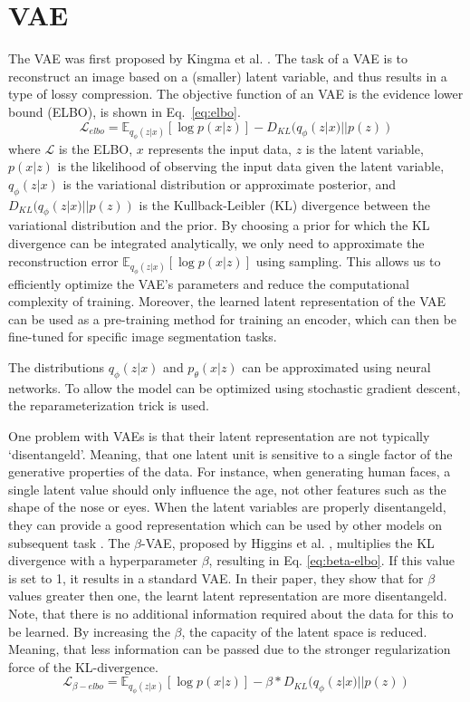 \section{VAE}
The VAE was first proposed by Kingma et al. \cite{kingma2014autoencodingvariationalbayes}. The task of a VAE is to reconstruct an image based on a (smaller) latent variable, and thus results in a type of lossy compression. The objective function of an VAE is the evidence lower bound (ELBO), is shown in Eq.~\ref{eq:elbo}.
\begin{equation}
    \label{eq:elbo}
    \mathcal{L}_{elbo} = \mathbb{E}_{q_{\phi}(z|x)}[\log p(x|z)] - D_{KL}(q_{\phi}(z|x) || p(z))
\end{equation}
where $\mathcal{L}$ is the ELBO, $x$ represents the input data, $z$ is the latent variable, $p(x|z)$ is the likelihood of observing the input data given the latent variable, $q_\phi(z|x)$ is the variational distribution or approximate posterior, and $D_{KL}(q_{\phi}(z|x) || p(z))$ is the Kullback-Leibler (KL) divergence between the variational distribution and the prior. By choosing a prior for which the KL divergence can be integrated analytically, we only need to approximate the reconstruction error $\mathbb{E}_{q_{\phi}(z|x)}[\log p(x|z)]$ using sampling. This allows us to efficiently optimize the VAE's parameters and reduce the computational complexity of training. Moreover, the learned latent representation of the VAE can be used as a pre-training method for training an encoder, which can then be fine-tuned for specific image segmentation tasks.

The distributions $q_{\phi}(z | x)$ and $p_{\theta}(x | z)$ can be approximated using neural networks. To allow the model can be optimized using stochastic gradient descent, the reparameterization trick is used.

One problem with VAEs is that their latent representation are not typically `disentangeld'. Meaning, that one latent unit is sensitive to a single factor of the generative properties of the data. For instance, when generating human faces, a single latent value should only influence the age, not other features such as the shape of the nose or eyes. When the latent variables are properly disentangeld, they can provide a good representation which can be used by other models on subsequent task \cite{bengio2014representationlearningreviewnew}. The $\beta$-VAE, proposed by Higgins et al. \cite{higgins2017betavae}, multiplies the KL divergence with a hyperparameter $\beta$, resulting in Eq. \ref{eq:beta-elbo}. If this value is set to 1, it results in a standard VAE\@. In their paper, they show that for $\beta$ values greater then one, the learnt latent representation are more disentangeld. Note, that there is no additional information required about the data for this to be learned. By increasing the $\beta$, the capacity of the latent space is reduced. Meaning, that less information can be passed due to the stronger regularization force of the KL-divergence.
\begin{equation}
    \label{eq:beta-elbo}
    \mathcal{L}_{\beta-elbo} = \mathbb{E}_{q_{\phi}(z|x)}[\log p(x|z)] - \beta * D_{KL}(q_{\phi}(z|x) || p(z))
\end{equation}

